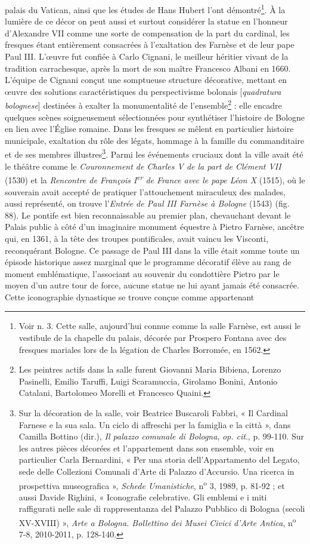 \documentclass[12pt,twoside,openany]{book}
\begin{document}
palais du Vatican, ainsi que les études de Hans Hubert l’ont démontré\footnote{Voir n. 3. Cette salle, aujourd’hui connue comme la salle Farnèse, est aussi le vestibule de la chapelle du palais, décorée par Prospero Fontana avec des fresques mariales lors de la légation de Charles Borromée, en 1562.}. À la lumière de ce décor on peut aussi et surtout considérer la statue en l’honneur d’Alexandre VII comme une sorte de compensation de la part du cardinal, les fresques étant entièrement consacrées à l’exaltation des Farnèse et de leur pape Paul III. L’œuvre fut confiée à Carlo Cignani, le meilleur héritier vivant de la tradition carrachesque, après la mort de son maître Francesco Albani en 1660. L’équipe de Cignani conçut une somptueuse structure décorative, mettant en œuvre des solutions caractéristiques du perspectivisme bolonais [\textit{quadratura bolognese}] destinées à exalter la monumentalité de l’ensemble\footnote{Les peintres actifs dans la salle furent Giovanni Maria Bibiena, Lorenzo Pasinelli, Emilio Taruffi, Luigi Scaramuccia, Girolamo Bonini, Antonio Catalani, Bartolomeo Morelli et Francesco Quaini.} : elle encadre quelques scènes soigneusement sélectionnées pour synthétiser l’histoire de Bologne en lien avec l’Église romaine. Dans les fresques se mêlent en particulier histoire municipale, exaltation du rôle des légats, hommage à la famille du commanditaire et de ses membres illustres\footnote{Sur la décoration de la salle, voir Beatrice Buscaroli Fabbri, « Il Cardinal Farnese e la sua sala. Un ciclo di affreschi per la famiglia e la città », dans Camilla Bottino (dir.), \textit{Il palazzo comunale di Bologna}, \textit{op. cit}., p. 99-110. Sur les autres pièces décorées et l’appartement dans son ensemble, voir en particulier Carla Bernardini, « Per una storia dell’Appartamento del Legato, sede delle Collezioni Comunali d’Arte di Palazzo d’Accursio. Una ricerca in prospettiva museografica », \textit{Schede Umanistiche}, n\textsuperscript{o} 3, 1989, p. 81-92 ; et aussi Davide Righini, « Iconografie celebrative. Gli emblemi e i miti raffigurati nelle sale di rappresentanza del Palazzo Pubblico di Bologna (secoli XV-XVIII) », \textit{Arte a Bologna. Bollettino dei Musei Civici d’Arte Antica}, n\textsuperscript{o} 7-8, 2010-2011, p. 128-140.}. Parmi les événements cruciaux dont la ville avait été le théâtre comme le \textit{Couronnement de Charles V de la part de Clément VII }(1530) et la \textit{Rencontre de François I}\textit{\textsuperscript{er }}\textit{de France avec le pape Léon X }(1515), où le souverain avait accepté de pratiquer l’attouchement miraculeux des malades, aussi représenté, on trouve l’\textit{Entrée de Paul III Farnèse à Bologne }(1543) (fig. 88). Le pontife est bien reconnaissable au premier plan, chevauchant devant le Palais public à côté d’un imaginaire monument équestre à Pietro Farnèse, ancêtre qui, en 1361, à la tête des troupes pontificales, avait vaincu les Visconti, reconquérant Bologne. Ce passage de Paul III dans la ville était somme toute un épisode historique assez marginal que le programme décoratif élève au rang de moment emblématique, l’associant au souvenir du condottière Pietro par le moyen d’un autre tour de force, aucune statue ne lui ayant jamais été consacrée. Cette iconographie dynastique se trouve conçue comme appartenant 
\end{document}
